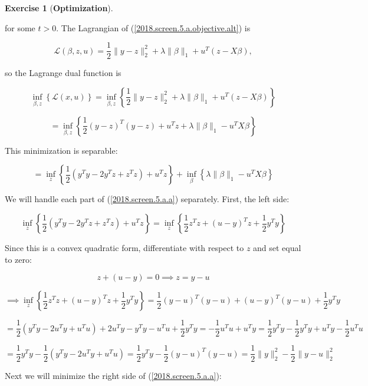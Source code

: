 \documentclass{article}
\theoremstyle{definition}
\newtheorem{exercise}{Exercise}
\theoremstyle{definition}
\theoremstyle{definition}
\theoremstyle{definition}
\theoremstyle{definition}
\begin{document}
\begin{exercise}[\textbf{Optimization}]
\begin{enumerate}[(a)]
for some \(t >0\). The Lagrangian of (\ref{2018.screen.5.a.objective.alt}) is

\[
\mathcal{L}(\beta, z, u) = \frac{1}{2} \lVert y - z \rVert_2^2 + \lambda \lVert \beta \rVert_1 + u^T(z - X \beta),
\]

so the Lagrange dual function is

\[
\inf_{\beta, z} \left\{ \mathcal{L}(x, u)\right\}  = \inf_{\beta, z} \left\{\frac{1}{2} \lVert y - z \rVert_2^2 + \lambda \lVert \beta \rVert_1 + u^T(z - X \beta)  \right\}
\]

\[
= \inf_{\beta, z} \left\{\frac{1}{2} (y-z)^T(y-z) + u^T z + \lambda \lVert \beta \rVert_1  - u^T X \beta  \right\} 
\]

This minimization is separable:

\begin{equation}\label{2018.screen.5.a.a}
= \inf_{z} \left\{\frac{1}{2} \left(y^Ty - 2 y^Tz + z^Tz \right) + u^T z \right\} + \inf_{\beta} \left\{ \lambda \lVert \beta \rVert_1  - u^T X \beta  \right\}
\end{equation}

We will handle each part of (\ref{2018.screen.5.a.a}) separately. First, the left side:

\[
 \inf_{z} \left\{\frac{1}{2} \left(y^Ty - 2 y^Tz + z^Tz \right) + u^T z \right\} = \inf_{z} \left\{\frac{1}{2}z^Tz  + (u - y)^Tz + \frac{1}{2} y^Ty   \right\} 
\]

Since this is a convex quadratic form, differentiate with respect to \(z\) and set equal to zero:

\begin{equation}\label{other.part.result}
z + (u - y) = 0 \implies z = y - u
\end{equation}

\[
 \implies \inf_{z} \left\{\frac{1}{2}z^Tz  + (u - y)^Tz + \frac{1}{2} y^Ty   \right\} =  \frac{1}{2}(y - u) ^T(y - u)  + (u - y)^T(y - u) + \frac{1}{2} y^Ty 
\]

\[
=  \frac{1}{2}\left(y^Ty -2 u^Ty + u^Tu \right)  + 2u^Ty - y^Ty - u^Tu + \frac{1}{2} y^Ty  = -\frac{1}{2}u^Tu   + u^Ty = \frac{1}{2} y^Ty - \frac{1}{2}y^Ty  + u^Ty - \frac{1}{2} u^Tu 
\]

\[
= \frac{1}{2} y^Ty - \frac{1}{2}(y^Ty - 2u^Ty + u^Tu ) = \frac{1}{2} y^Ty - \frac{1}{2}(y - u)^T(y - u)= \frac{1}{2} \lVert y \rVert_2^2 - \frac{1}{2} \lVert y - u \rVert_2^2 
\]

Next we will minimize the right side of (\ref{2018.screen.5.a.a}):


\end{enumerate}
\end{exercise}
\end{document}
